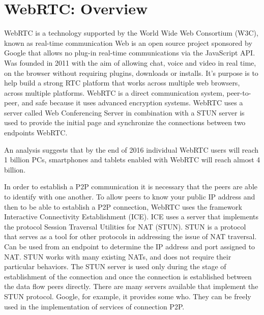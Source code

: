 \section{WebRTC: Overview}
\label{sec:WebRTC: Overview}
WebRTC is a technology supported by the World Wide Web Consortium (W3C), known as real-time communication Web is an open source project sponsored by Google that allows no plug-in real-time communications via the JavaScript API. Was founded in 2011 with the aim of allowing chat, voice and video in real time, on the browser without requiring plugins, downloads or installs.
It’s purpose is to help build a strong RTC platform that works across multiple web browsers, across multiple platforms.\cite{webrtc}
WebRTC is a direct communication system, peer-to-peer, and safe because it uses advanced encryption systems.
WebRTC uses a server called Web Conferencing Server in combination with a STUN server is used to provide the initial page and synchronize the connections between two endpoints WebRTC.

An analysis suggests that by the end of 2016 individual WebRTC users will reach 1 billion PCs, smartphones and tablets enabled with WebRTC will reach almost 4 billion.

In order to establish a P2P communication it is necessary that the peers are able to identify with one another.
To allow peers to know your public IP address and then to be able to establish a P2P connection, WebRTC uses the framework Interactive Connectivity Establishment (ICE).\cite{webrtc2}
ICE uses a server that implements the protocol Session Traversal Utilities for NAT (STUN). STUN is a protocol that serves as a tool for other protocols in addressing the issue of NAT traversal. Can be used from an endpoint to determine the IP address and port assigned to NAT. STUN works with many existing NATs, and does not require their particular behaviors.\cite{webrtc1}
The STUN server is used only during the stage of establishment of the connection and once the connection is established between the data flow peers directly. There are many servers available that implement the STUN protocol. Google, for example, it provides some who.
They can be freely used in the implementation of services of connection P2P.